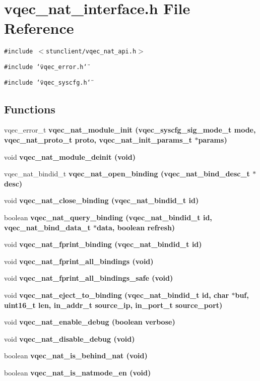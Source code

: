 \section{vqec\_\-nat\_\-interface.h File Reference}
\label{vqec__nat__interface_8h}
{\tt \#include $<$stunclient/vqec\_\-nat\_\-api.h$>$}\par
{\tt \#include \char`\"{}vqec\_\-error.h\char`\"{}}\par
{\tt \#include \char`\"{}vqec\_\-syscfg.h\char`\"{}}\par
\subsection*{Functions}
\begin{CompactItemize}
\item 
vqec\_\-error\_\-t \bf{vqec\_\-nat\_\-module\_\-init} (\bf{vqec\_\-syscfg\_\-sig\_\-mode\_\-t} mode, vqec\_\-nat\_\-proto\_\-t proto, vqec\_\-nat\_\-init\_\-params\_\-t $\ast$params)
\item 
void \bf{vqec\_\-nat\_\-module\_\-deinit} (void)
\item 
vqec\_\-nat\_\-bindid\_\-t \bf{vqec\_\-nat\_\-open\_\-binding} (vqec\_\-nat\_\-bind\_\-desc\_\-t $\ast$desc)
\item 
void \bf{vqec\_\-nat\_\-close\_\-binding} (vqec\_\-nat\_\-bindid\_\-t id)
\item 
boolean \bf{vqec\_\-nat\_\-query\_\-binding} (vqec\_\-nat\_\-bindid\_\-t id, vqec\_\-nat\_\-bind\_\-data\_\-t $\ast$data, boolean refresh)
\item 
void \bf{vqec\_\-nat\_\-fprint\_\-binding} (vqec\_\-nat\_\-bindid\_\-t id)
\item 
void \bf{vqec\_\-nat\_\-fprint\_\-all\_\-bindings} (void)
\item 
void \bf{vqec\_\-nat\_\-fprint\_\-all\_\-bindings\_\-safe} (void)
\item 
void \bf{vqec\_\-nat\_\-eject\_\-to\_\-binding} (vqec\_\-nat\_\-bindid\_\-t id, char $\ast$buf, uint16\_\-t len, in\_\-addr\_\-t source\_\-ip, in\_\-port\_\-t source\_\-port)
\item 
void \bf{vqec\_\-nat\_\-enable\_\-debug} (boolean verbose)
\item 
void \bf{vqec\_\-nat\_\-disable\_\-debug} (void)
\item 
boolean \bf{vqec\_\-nat\_\-is\_\-behind\_\-nat} (void)
\item 
boolean \bf{vqec\_\-nat\_\-is\_\-natmode\_\-en} (void)
\end{CompactItemize}


